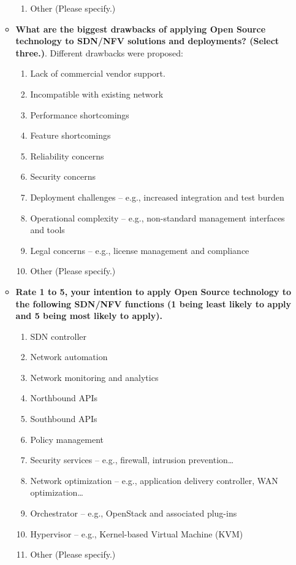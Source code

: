 \documentclass[a4paper, 12pt]{book}
\begin{document}
\begin{enumerate}
\begin{itemize}
\begin{enumerate}
\item{Other (Please specify.)}
\end{enumerate}
\item{\textbf{What are the biggest drawbacks of applying Open Source technology to SDN/NFV solutions and deployments? (Select three.)}}. Different drawbacks were proposed:
\begin{enumerate}\itemsep0pt
\item{Lack of commercial vendor support}.
\item{Incompatible with existing network}
\item{Performance shortcomings}
\item{Feature shortcomings}
\item{Reliability concerns}
\item{Security concerns}
\item{Deployment challenges – e.g., increased integration and test burden}
\item{Operational complexity – e.g., non-standard management interfaces and tools}
\item{Legal concerns – e.g., license management and compliance}
\item{Other (Please specify.)}
\end{enumerate}
\item{\textbf{Rate 1 to 5, your intention to apply Open Source technology to the following SDN/NFV functions (1 being least likely to apply and 5 being most likely to apply).}}
\begin{enumerate}\itemsep0pt
\item{SDN controller}
\item{Network automation}
\item{Network monitoring and analytics}
\item{Northbound APIs}
\item{Southbound APIs}
\item{Policy management}
\item{Security services – e.g., firewall, intrusion prevention…}
\item{Network optimization – e.g., application delivery controller, WAN optimization…}
\item{Orchestrator – e.g., OpenStack and associated plug-ins}
\item{Hypervisor – e.g., Kernel-based Virtual Machine (KVM)}
\item{Other (Please specify.)}
\end{enumerate}
\end{itemize}
\end{enumerate}
\end{document}
